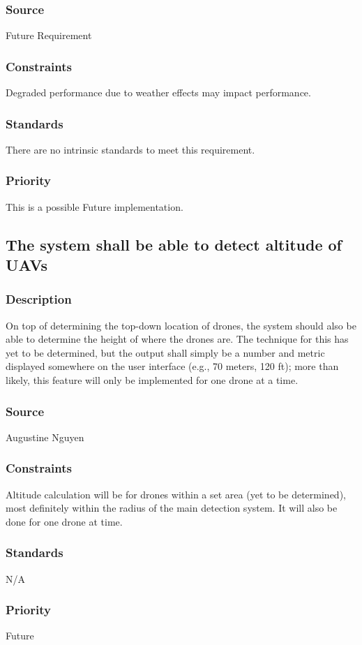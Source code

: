 \subsubsection{Source}
Future Requirement
\subsubsection{Constraints}
Degraded performance due to weather effects may impact performance.
\subsubsection{Standards}
There are no intrinsic standards to meet this requirement.
\subsubsection{Priority}
This is a possible Future implementation.
\subsection{The system shall be able to detect altitude of UAVs}
\subsubsection{Description}
On top of determining the top-down location of drones, the system should also be able to determine the height of where the drones are.  The technique for this has yet to be determined, but the output shall simply be a number and metric displayed somewhere on the user interface (e.g., 70 meters, 120 ft); more than likely, this feature will only be implemented for one drone at a time.
\subsubsection{Source}
Augustine Nguyen
\subsubsection{Constraints}
Altitude calculation will be for drones within a set area (yet to be determined), most definitely within the radius of the main detection system.  It will also be done for one drone at time.
\subsubsection{Standards}
N/A
\subsubsection{Priority}
Future
